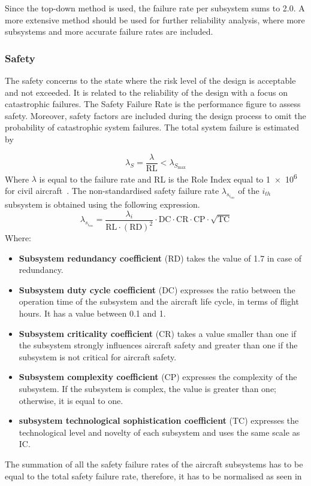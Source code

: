 Since the top-down method is used, the failure rate per subsystem sums to 2.0. A more extensive method should be used for further reliability analysis, where more subsystems and more accurate failure rates are included. 


\subsubsection{Safety}
The safety concerns to the state where the risk level of the design is acceptable and not exceeded.
It is related to the reliability of the design with a focus on catastrophic failures.
The Safety Failure Rate is the performance figure to assess safety.
Moreover, safety factors are included during the design process to omit the probability of catastrophic system failures.
The total system failure is estimated by 

\begin{equation}
    \label{eq:safetyfailurerate}
    \lambda_{S} = \frac{\lambda}{\text{RL}} < \lambda_{S_{\max}}
\end{equation}
Where $\lambda$ is equal to the failure rate and RL is the Role Index equal to \num{1e6} for civil aircraft~\cite{giovingo2019rams}.
The non-standardised safety failure rate $\lambda_{s_{i_{nn}}}$ of the $i_{th}$ subsystem is obtained using the following expression.
\begin{equation}
    \lambda_{s_{i_{nn}}} = \frac{\lambda_{i}}{\text{RL}\cdot(\text{RD})^2}\cdot \text{DC} \cdot \text{CR} \cdot \text{CP} \cdot \sqrt{\text{TC}}
\end{equation}
Where:
\begin{itemize}
    \item \textbf{Subsystem redundancy coefficient} (RD) takes the value of 1.7 in case of redundancy.
    \item \textbf{Subsystem duty cycle coefficient} (DC) expresses the ratio between the operation time of the subsystem and the aircraft life cycle, in terms of flight hours.
    It has a value between 0.1 and 1.
    \item \textbf{Subsystem criticality coefficient} (CR) takes a value smaller than one if the subsystem strongly influences aircraft safety and greater than one if the subsystem is not critical for aircraft safety.
    \item \textbf{Subsystem complexity coefficient} (CP) expresses the complexity of the subsystem.
    If the subsystem is complex, the value is greater than one; otherwise, it is equal to one.
    \item \textbf{subsystem technological sophistication coefficient} (TC) expresses the technological level and novelty of each subsystem and uses the same scale as IC.
\end{itemize}
The summation of all the safety failure rates of the aircraft subsystems has to be equal to the total safety failure rate, therefore, it has to be normalised as seen in 


